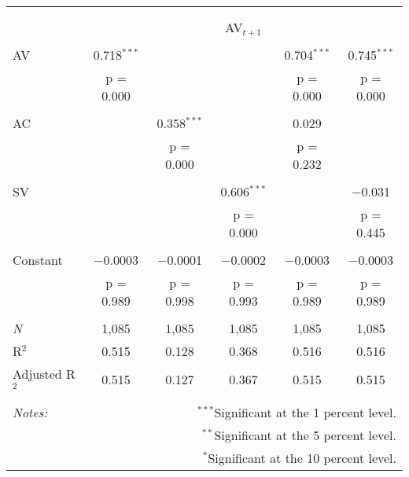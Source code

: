 
\begin{tabular}{@{\extracolsep{5pt}}lccccc} 
\\[-1.8ex]\hline 
\hline \\[-1.8ex] 
\\[-1.8ex] & \multicolumn{5}{c}{AV$_{t+1}$} \\ 
\hline \\[-1.8ex] 
 AV & 0.718$^{***}$ &  &  & 0.704$^{***}$ & 0.745$^{***}$ \\ 
  & p = 0.000 &  &  & p = 0.000 & p = 0.000 \\ 
  & & & & & \\ 
 AC &  & 0.358$^{***}$ &  & 0.029 &  \\ 
  &  & p = 0.000 &  & p = 0.232 &  \\ 
  & & & & & \\ 
 SV &  &  & 0.606$^{***}$ &  & $-$0.031 \\ 
  &  &  & p = 0.000 &  & p = 0.445 \\ 
  & & & & & \\ 
 Constant & $-$0.0003 & $-$0.0001 & $-$0.0002 & $-$0.0003 & $-$0.0003 \\ 
  & p = 0.989 & p = 0.998 & p = 0.993 & p = 0.989 & p = 0.989 \\ 
  & & & & & \\ 
\textit{N} & 1,085 & 1,085 & 1,085 & 1,085 & 1,085 \\ 
R$^{2}$ & 0.515 & 0.128 & 0.368 & 0.516 & 0.516 \\ 
Adjusted R$^{2}$ & 0.515 & 0.127 & 0.367 & 0.515 & 0.515 \\ 
\hline 
\hline \\[-1.8ex] 
\textit{Notes:} & \multicolumn{5}{r}{$^{***}$Significant at the 1 percent level.} \\ 
 & \multicolumn{5}{r}{$^{**}$Significant at the 5 percent level.} \\ 
 & \multicolumn{5}{r}{$^{*}$Significant at the 10 percent level.} \\ 
\end{tabular} 
